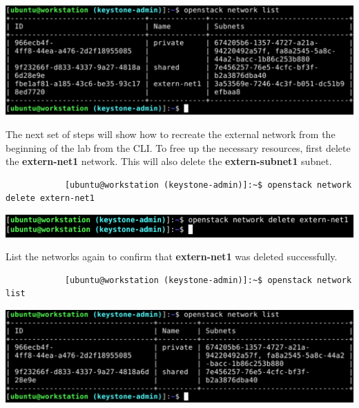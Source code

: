 \documentclass[letterpaper, 12pt]{article}
\begin{document}
\begin{enumerate}
\begin{labstep}
        \begin{center}
            \includegraphics[width=\linewidth]{images/part1/step12.png}
        \end{center}
    \end{labstep}

    \begin{labstep}
        The next set of steps will show how to recreate the external network from the beginning of the lab from the CLI.
        To free up the necessary resources, first delete the \textbf{extern-net1} network.
        This will also delete the \textbf{extern-subnet1} subnet.
        \begin{lstlisting}
            [ubuntu@workstation (keystone-admin)]:~$ openstack network delete extern-net1
        \end{lstlisting}

        \begin{center}
            \includegraphics[width=\linewidth]{images/part1/step13.png}
        \end{center}
    \end{labstep}

    \begin{labstep}
        List the networks again to confirm that \textbf{extern-net1} was deleted successfully.
        \begin{lstlisting}
            [ubuntu@workstation (keystone-admin)]:~$ openstack network list
        \end{lstlisting}

        \begin{center}
            \includegraphics[width=\linewidth]{images/part1/step14.png}
        \end{center}
    \end{labstep}


\end{enumerate}
\end{document}
